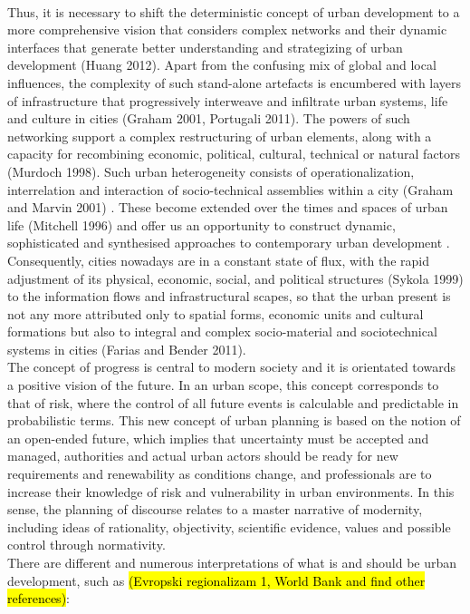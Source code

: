 \documentclass[11pt]{report}
\begin{document}
\\
Thus, it is necessary to shift the deterministic concept of urban development to a more comprehensive vision that considers complex networks and their dynamic interfaces that generate better understanding and strategizing of urban development (Huang 2012). Apart from the confusing mix of global and local influences, the complexity of such stand-alone artefacts is encumbered with layers of infrastructure that progressively interweave and infiltrate urban systems, life and culture in cities (Graham 2001, Portugali 2011). The powers of such networking support a complex restructuring of urban elements, along with a capacity for recombining economic, political, cultural, technical or natural factors (Murdoch 1998). Such urban heterogeneity consists of operationalization, interrelation and interaction of socio-technical assemblies within a city (Graham and Marvin 2001) . These become extended over the times and spaces of urban life  (Mitchell 1996) and offer us an opportunity to construct dynamic, sophisticated and synthesised approaches to contemporary urban development . Consequently, cities nowadays are in a constant state of flux, with the rapid adjustment of its physical, economic, social, and political structures (Sykola 1999) to the information flows and infrastructural scapes, so that the urban present is not any more attributed only to spatial forms, economic units and cultural formations but also to integral and complex socio-material and sociotechnical systems in cities (Farias and Bender 2011). 
\\
The concept of progress is central to modern society and it is orientated towards a positive vision of the future. In an urban scope, this concept corresponds to that of risk, where the control of all future events is calculable and predictable in probabilistic terms. This new concept of urban planning is based on the notion of an open-ended future, which implies that uncertainty must be accepted and managed, authorities and actual urban actors should be ready for new requirements and renewability as conditions change, and professionals are to increase their knowledge of risk and vulnerability in urban environments. In this sense, the planning of discourse relates to a master narrative of modernity, including ideas of rationality, objectivity, scientific evidence, values and possible control through normativity.
\\
There are different and numerous interpretations of what is and should be urban development, such as \hl{(Evropski regionalizam 1, World Bank and find other references)}:
\end{document}
